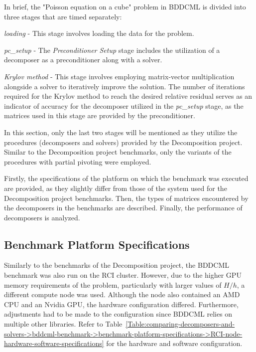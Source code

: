 In brief, the "Poisson equation on a cube" problem in BDDCML is divided into three stages that are timed separately\label{Text:comparing-decomposers-and-solvers->bddcml-benchmark->poisson-on-cube-stages}:
%
\begin{tight_enumerate}
	\item \textit{loading} - This stage involves loading the data for the problem.
	\item \textit{pc\_setup} - The \textit{Preconditioner Setup} stage includes the utilization of a decomposer as a preconditioner along with a solver.
	\item \textit{Krylov method} - This stage involves employing matrix-vector multiplication alongside a solver to iteratively improve the solution.
The number of iterations required for the Krylov method to reach the desired relative residual serves as an indicator of accuracy for the decomposer utilized in the \textit{pc\_setup} stage, as the matrices used in this stage are provided by the preconditioner.
\end{tight_enumerate}

In this section, only the last two stages will be mentioned as they utilize the procedures (decomposers and solvers) provided by the Decomposition project.
Similar to the Decomposition project benchmarks, only the variants of the procedures with partial pivoting were employed.

Firstly, the specifications of the platform on which the benchmark was executed are provided, as they slightly differ from those of the system used for the Decomposition project benchmarks.
Then, the types of matrices encountered by the decomposers in the benchmarks are described.
Finally, the performance of decomposers is analyzed.

\subsection{Benchmark Platform Specifications}\label{Subsection:comparing-decomposers-and-solvers->bddcml-benchmark->benchmark-platform-specifications}
Similarly to the benchmarks of the Decomposition project, the BDDCML benchmark was also run on the RCI cluster.
However, due to the higher GPU memory requirements of the problem, particularly with larger values of $H/h$, a different compute node was used.
Although the node also contained an AMD CPU and an Nvidia GPU, the hardware configuration differed.
Furthermore, adjustments had to be made to the configuration since BDDCML relies on multiple other libraries.
Refer to Table~\ref{Table:comparing-decomposers-and-solvers->bddcml-benchmark->benchmark-platform-specifications->RCI-node-hardware-software-specifications} for the hardware and software configuration.

